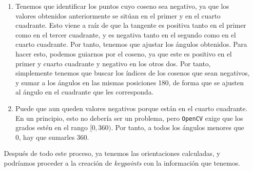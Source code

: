 \documentclass[11pt,a4paper]{article}
\begin{document}
\begin{enumerate}
	\item Tenemos que identificar los puntos cuyo coseno sea negativo, ya que los valores
	obtenidos anteriormente se sitúan en el primer y en el cuarto cuadrante. Esto viene a raíz
	de que la tangente es positiva tanto en el primer como en el tercer cuadrante, y es negativa
	tanto en el segundo como en el cuarto cuadrante.  Por tanto, tenemos que ajustar los ángulos
	obtenidos. Para hacer esto, podemos guiarnos por el coseno, ya que este es positivo en el primer
	y cuarto cuadrante y negativo en los otros dos. Por tanto, simplemente tenemos que buscar los
	índices de los cosenos que sean negativos, y sumar a los ángulos en las mismas posiciones
	180, de forma que se ajusten al ángulo en el cuadrante que les corresponda.
	\item Puede que aun queden valores negativos porque están en el cuarto cuadrante. En un principio,
	esto no debería ser un problema, pero \texttt{OpenCV} exige que los grados estén en el rango
	$[0, 360)$. Por tanto, a todos los ángulos menores que 0, hay que sumarles 360.
\end{enumerate}

Después de todo este proceso, ya tenemos las orientaciones calculadas, y podríamos
proceder a la creación de \textit{keypoints} con la información que tenemos.
\end{document}
